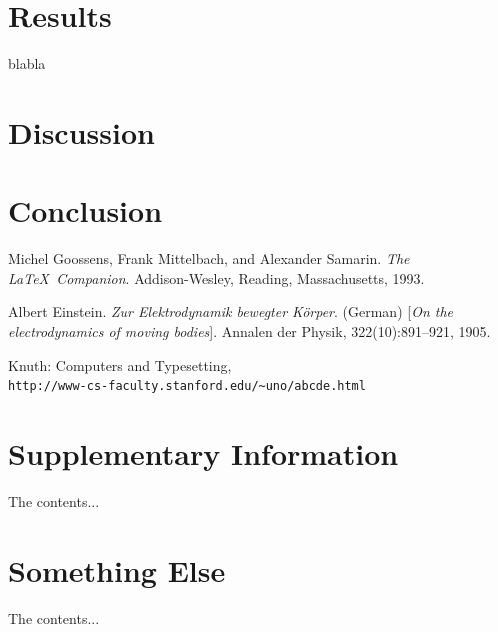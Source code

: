 \documentclass[12pt]{article}
\begin{document}
\newpage
\section{Results}
blabla

\newpage
\section{Discussion}


\newpage
\section{Conclusion}


\newpage
{}
\begin{thebibliography}{9}
Michel Goossens, Frank Mittelbach, and Alexander Samarin. 
\textit{The \LaTeX\ Companion}. 
Addison-Wesley, Reading, Massachusetts, 1993.
 
Albert Einstein. 
\textit{Zur Elektrodynamik bewegter K{\"o}rper}. (German) 
[\textit{On the electrodynamics of moving bodies}]. 
Annalen der Physik, 322(10):891–921, 1905.
 
Knuth: Computers and Typesetting,
\\\texttt{http://www-cs-faculty.stanford.edu/\~{}uno/abcde.html}
\end{thebibliography}
\newpage

\begin{appendices}
\section{Supplementary Information}
The contents...

\newpage
\section{Something Else}
The contents...
\end{appendices}
\end{document}
